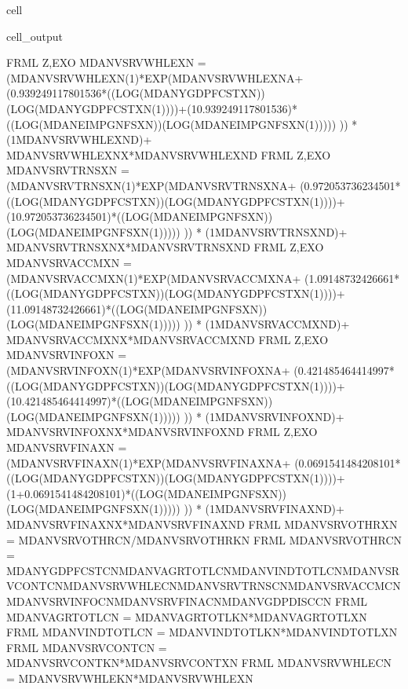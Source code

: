\documentclass[letterpaper,10pt,english]{jupyterBook}
\begin{document}
\begin{sphinxuseclass}{cell}
\begin{sphinxVerbatimOutput}
\begin{sphinxuseclass}{cell_output}
\begin{sphinxVerbatim}[commandchars=\\\{\}]
FRML \PYGZlt{}Z,EXO\PYGZgt{} MDANVSRVWHLEXN = (MDANVSRVWHLEXN(\PYGZhy{}1)*EXP(MDANVSRVWHLEXN\PYGZus{}A+ (0.939249117801536*((LOG(MDANYGDPFCSTXN))\PYGZhy{}(LOG(MDANYGDPFCSTXN(\PYGZhy{}1))))+(1\PYGZhy{}0.939249117801536)*((LOG(MDANEIMPGNFSXN))\PYGZhy{}(LOG(MDANEIMPGNFSXN(\PYGZhy{}1))))) )) * (1\PYGZhy{}MDANVSRVWHLEXN\PYGZus{}D)+ MDANVSRVWHLEXN\PYGZus{}X*MDANVSRVWHLEXN\PYGZus{}D  \PYGZdl{}
FRML \PYGZlt{}Z,EXO\PYGZgt{} MDANVSRVTRNSXN = (MDANVSRVTRNSXN(\PYGZhy{}1)*EXP(MDANVSRVTRNSXN\PYGZus{}A+ (0.972053736234501*((LOG(MDANYGDPFCSTXN))\PYGZhy{}(LOG(MDANYGDPFCSTXN(\PYGZhy{}1))))+(1\PYGZhy{}0.972053736234501)*((LOG(MDANEIMPGNFSXN))\PYGZhy{}(LOG(MDANEIMPGNFSXN(\PYGZhy{}1))))) )) * (1\PYGZhy{}MDANVSRVTRNSXN\PYGZus{}D)+ MDANVSRVTRNSXN\PYGZus{}X*MDANVSRVTRNSXN\PYGZus{}D  \PYGZdl{}
FRML \PYGZlt{}Z,EXO\PYGZgt{} MDANVSRVACCMXN = (MDANVSRVACCMXN(\PYGZhy{}1)*EXP(MDANVSRVACCMXN\PYGZus{}A+ (1.09148732426661*((LOG(MDANYGDPFCSTXN))\PYGZhy{}(LOG(MDANYGDPFCSTXN(\PYGZhy{}1))))+(1\PYGZhy{}1.09148732426661)*((LOG(MDANEIMPGNFSXN))\PYGZhy{}(LOG(MDANEIMPGNFSXN(\PYGZhy{}1))))) )) * (1\PYGZhy{}MDANVSRVACCMXN\PYGZus{}D)+ MDANVSRVACCMXN\PYGZus{}X*MDANVSRVACCMXN\PYGZus{}D  \PYGZdl{}
FRML \PYGZlt{}Z,EXO\PYGZgt{} MDANVSRVINFOXN = (MDANVSRVINFOXN(\PYGZhy{}1)*EXP(MDANVSRVINFOXN\PYGZus{}A+ (0.421485464414997*((LOG(MDANYGDPFCSTXN))\PYGZhy{}(LOG(MDANYGDPFCSTXN(\PYGZhy{}1))))+(1\PYGZhy{}0.421485464414997)*((LOG(MDANEIMPGNFSXN))\PYGZhy{}(LOG(MDANEIMPGNFSXN(\PYGZhy{}1))))) )) * (1\PYGZhy{}MDANVSRVINFOXN\PYGZus{}D)+ MDANVSRVINFOXN\PYGZus{}X*MDANVSRVINFOXN\PYGZus{}D  \PYGZdl{}
FRML \PYGZlt{}Z,EXO\PYGZgt{} MDANVSRVFINAXN = (MDANVSRVFINAXN(\PYGZhy{}1)*EXP(MDANVSRVFINAXN\PYGZus{}A+ (\PYGZhy{}0.0691541484208101*((LOG(MDANYGDPFCSTXN))\PYGZhy{}(LOG(MDANYGDPFCSTXN(\PYGZhy{}1))))+(1+0.0691541484208101)*((LOG(MDANEIMPGNFSXN))\PYGZhy{}(LOG(MDANEIMPGNFSXN(\PYGZhy{}1))))) )) * (1\PYGZhy{}MDANVSRVFINAXN\PYGZus{}D)+ MDANVSRVFINAXN\PYGZus{}X*MDANVSRVFINAXN\PYGZus{}D  \PYGZdl{}
FRML  \PYGZlt{}\PYGZgt{} MDANVSRVOTHRXN = MDANVSRVOTHRCN/MDANVSRVOTHRKN \PYGZdl{}
FRML  \PYGZlt{}\PYGZgt{} MDANVSRVOTHRCN = MDANYGDPFCSTCN\PYGZhy{}MDANVAGRTOTLCN\PYGZhy{}MDANVINDTOTLCN\PYGZhy{}MDANVSRVCONTCN\PYGZhy{}MDANVSRVWHLECN\PYGZhy{}MDANVSRVTRNSCN\PYGZhy{}MDANVSRVACCMCN\PYGZhy{}MDANVSRVINFOCN\PYGZhy{}MDANVSRVFINACN\PYGZhy{}MDANVGDPDISCCN \PYGZdl{}
FRML  \PYGZlt{}\PYGZgt{} MDANVAGRTOTLCN = MDANVAGRTOTLKN*MDANVAGRTOTLXN \PYGZdl{}
FRML  \PYGZlt{}\PYGZgt{} MDANVINDTOTLCN = MDANVINDTOTLKN*MDANVINDTOTLXN \PYGZdl{}
FRML  \PYGZlt{}\PYGZgt{} MDANVSRVCONTCN = MDANVSRVCONTKN*MDANVSRVCONTXN \PYGZdl{}
FRML  \PYGZlt{}\PYGZgt{} MDANVSRVWHLECN = MDANVSRVWHLEKN*MDANVSRVWHLEXN \PYGZdl{}

\end{sphinxVerbatim}
\end{sphinxuseclass}
\end{sphinxVerbatimOutput}
\end{sphinxuseclass}
\end{document}
